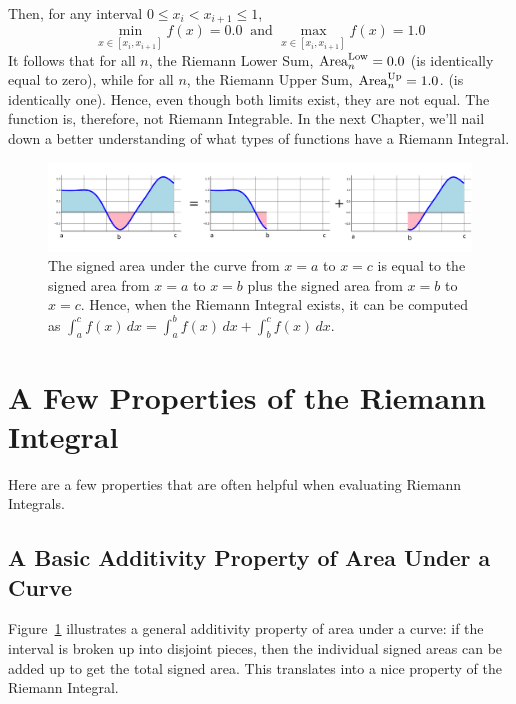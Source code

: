 Then, for any interval $0 \le x_i < x_{i+1} \le 1$, 
\begin{equation}
\min_{x \in [x_i, x_{i+1}]} f(x) = 0.0 ~\text{ and } \max_{x \in [x_i, x_{i+1}]} f(x) =1.0 
\end{equation}
It follows that for all $n$, the Riemann Lower Sum, ${\rm Area}^{\rm Low}_n=0.0$ (is identically equal to zero), while for all $n$, the Riemann Upper Sum, ${\rm Area}^{\rm Up}_n= 1.0$. (is identically one). Hence, even though both limits exist, they are not equal. The function is, therefore, not Riemann Integrable. In the next Chapter, we'll nail down a better understanding of what types of functions have a Riemann Integral.

 \vspace*{.5cm}

\begin{figure}[hbt]%
\centering
\includegraphics[width=0.95\columnwidth]{graphics/Chap03/SumDifferenceAreasMerged.png}%
    \caption[]{The signed area under the curve from $x=a$ to $x=c$ is equal to the signed area from $x=a$ to $x=b$ plus the signed area from $x=b$ to $x=c$. Hence, when the Riemann Integral exists, it can be computed as $\int_{a}^{c} f(x)\, dx =\int_{a}^{b} f(x)\, dx + \int_{b}^{c} f(x)\, dx$. }
    \label{fig:RiemannIntegralAdditivity}
\end{figure}

\section{A Few Properties of the Riemann Integral}

Here are a few properties that are often helpful when evaluating Riemann Integrals. 

\subsection{A Basic Additivity Property of Area Under a Curve}

Figure~\ref{fig:RiemannIntegralAdditivity} illustrates a general additivity property of area under a curve: if the interval is broken up into disjoint pieces, then the individual signed areas can be added up to get the total signed area. This translates into a nice property of the Riemann Integral.

